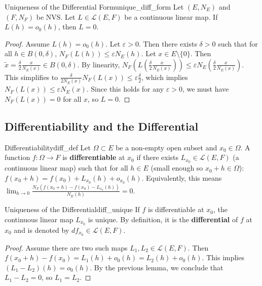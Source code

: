 \documentclass[11pt, a4paper]{article}
\newcommand{\eps}{\varepsilon}
\begin{document}
\begin{lemma}{Uniqueness of the Differential Form}{unique_diff_form}
Let $(E, N_E)$ and $(F, N_F)$ be NVS. Let $L \in \mathcal{L}(E, F)$ be a continuous linear map.
If $L(h) = o_0(h)$, then $L = 0$.
\end{lemma}
\begin{proof}
Assume $L(h) = o_0(h)$. Let $\eps > 0$. Then there exists $\delta > 0$ such that for all $h \in B(0, \delta)$, $N_F(L(h)) \le \eps N_E(h)$.
Let $x \in E \setminus \{0\}$. Then $\tilde{x} = \frac{\delta}{2} \frac{x}{N_E(x)} \in B(0, \delta)$.
By linearity, $N_F\left(L\left(\frac{\delta}{2} \frac{x}{N_E(x)}\right)\right) \le \eps N_E\left(\frac{\delta}{2} \frac{x}{N_E(x)}\right)$.
This simplifies to $\frac{\delta}{2 N_E(x)} N_F(L(x)) \le \eps \frac{\delta}{2}$, which implies $N_F(L(x)) \le \eps N_E(x)$.
Since this holds for any $\eps > 0$, we must have $N_F(L(x)) = 0$ for all $x$, so $L = 0$.
\end{proof}

\subsection{Differentiability and the Differential}
\begin{definition}{Differentiability}{diff_def}
Let $\Omega \subset E$ be a non-empty open subset and $x_0 \in \Omega$.
A function $f: \Omega \to F$ is \textbf{differentiable} at $x_0$ if there exists $L_{x_0} \in \mathcal{L}(E, F)$ (a continuous linear map) such that for all $h \in E$ (small enough so $x_0+h \in \Omega$):
$f(x_0 + h) = f(x_0) + L_{x_0}(h) + o_{x_0}(h)$.
Equivalently, this means $\lim_{h \to 0} \frac{N_F(f(x_0 + h) - f(x_0) - L_{x_0}(h))}{N_E(h)} = 0$.
\end{definition}

\begin{proposition}{Uniqueness of the Differential}{diff_unique}
If $f$ is differentiable at $x_0$, the continuous linear map $L_{x_0}$ is unique.
By definition, it is the \textbf{differential} of $f$ at $x_0$ and is denoted by $df_{x_0} \in \mathcal{L}(E, F)$.
\end{proposition}
\begin{proof}
Assume there are two such maps $L_1, L_2 \in \mathcal{L}(E, F)$.
Then $f(x_0 + h) - f(x_0) = L_1(h) + o_0(h) = L_2(h) + o_0(h)$.
This implies $(L_1 - L_2)(h) = o_0(h)$.
By the previous lemma, we conclude that $L_1 - L_2 = 0$, so $L_1 = L_2$.
\end{proof}
\end{document}
